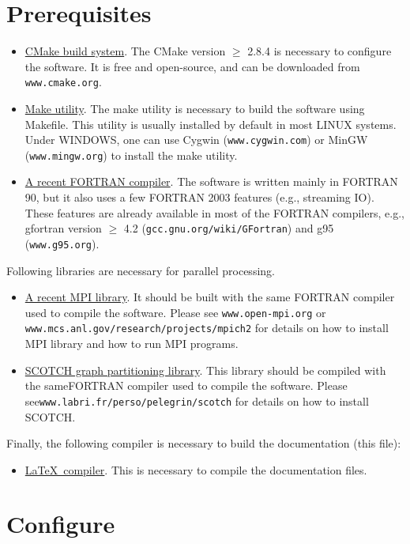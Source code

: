 \section{Prerequisites}
\begin{itemize}[-]
  \item \underline{CMake build system}. The CMake version $\ge$ 2.8.4 is necessary to configure the software. It is free and open-source, and can be downloaded from \texttt{www.cmake.org}.
  \item \underline{Make utility}. The make utility is necessary to build the software using Makefile. This utility is usually installed by default in most LINUX systems. Under WINDOWS, one can use Cygwin (\texttt{www.cygwin.com}) or MinGW (\texttt{www.mingw.org}) to install the make utility.
  \item \underline{A recent FORTRAN compiler}. The software is written mainly in FORTRAN 90, but it also uses a few FORTRAN 2003 features (e.g., streaming IO). These features are already available in most of the FORTRAN compilers, e.g., gfortran version $\ge$ 4.2 (\texttt{gcc.gnu.org/wiki/GFortran}) and g95 (\texttt{www.g95.org}).
\end{itemize}
  Following libraries are necessary for parallel processing.
\begin{itemize}[-]
  \item \underline{A recent MPI library}. It should be built with the same FORTRAN compiler used to compile the software. Please see \texttt{www.open-mpi.org} or \linebreak\texttt{www.mcs.anl.gov/research/projects/mpich2} for details on how to install MPI library and how to run MPI programs.
  \item \underline{SCOTCH graph partitioning library}. This library should be compiled with the same\linebreak FORTRAN compiler used to compile the software. Please see\linebreak \texttt{www.labri.fr/perso/pelegrin/scotch} for details on how to install SCOTCH.
\end{itemize}

  Finally, the following compiler is necessary to build the documentation (this file):
\begin{itemize}[-]
  \item \underline{\LaTeX\ compiler}. This is necessary to compile the documentation files.
\end{itemize}

\section{Configure}
\label{sec:configure}

